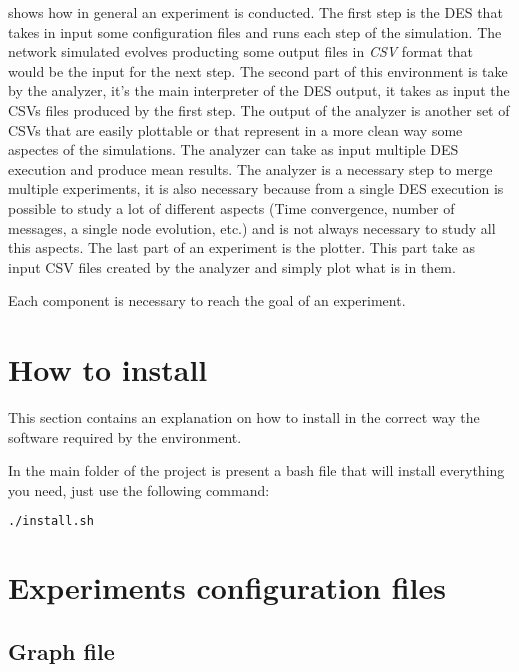 \documentclass[10pt,journal,onecolumn]{IEEEtran}
\begin{document}
 shows how in general an experiment is conducted.
The first step is the \ac{DES} that takes in input some configuration files
and runs each step of the simulation.
The network simulated evolves producting some output files in \textit{CSV} format
that would be the input for the next step.
The second part of this environment is take by the analyzer, it's the main
interpreter of the \ac{DES} output, it takes as input the CSVs files produced
by the first step. The output of the analyzer is another set of CSVs that are
easily plottable or that represent in a more clean way some aspectes of the simulations.
The analyzer can take as input multiple \ac{DES} execution and produce mean
results.
The analyzer is a necessary step to merge multiple experiments, it is also
necessary because from a single \ac{DES} execution is possible to study
a lot of different aspects (Time convergence, number of messages, a single node
evolution, etc.) and is not always necessary to study all this aspects.
The last part of an experiment is the plotter.
This part take as input CSV files created by the analyzer and simply plot what
is in them.

Each component is necessary to reach the goal of an experiment.

\section{How to install}
\label{sec:installation}

This section contains an explanation on how to install in the correct
way the software required by the environment.

In the main folder of the project is present a bash file that will install
everything you need, just use the following command:

\lstset{style=shell}
\begin{lstlisting}[language=bash]
	./install.sh
\end{lstlisting}

\section{Experiments configuration files}
\label{sec:exp_conf}

\subsection{Graph file}
\label{subsec:graph_file}
\end{document}
